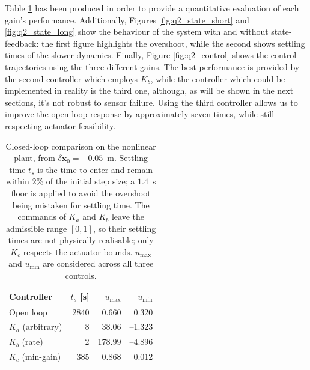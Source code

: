 \documentclass[10pt,a4paper]{scrartcl}
\begin{document}
Table \ref{tab:q2_cmp} has been produced in order to provide a quantitative evaluation of each gain's performance. 
Additionally, Figures \ref{fig:q2_state_short} and \ref{fig:q2_state_long} show the behaviour of the system with and without state-feedback: the first figure highlights the overshoot, while the second shows settling times of the slower dynamics. Finally, Figure \ref{fig:q2_control} shows the control trajectories using the three different gains. The best performance is provided by the second controller which employs $K_b$, while the controller which could be implemented in reality is the third one, although, as will be shown in the next sections, it's not robust to sensor failure. Using the third controller allows us to improve the open loop response by approximately seven times, while still respecting actuator feasibility. 

\begin{table}[htbp]
    \centering
    \small
    \renewcommand{\arraystretch}{1.1}
    \begin{tabular}{l r r r}
        \toprule
        Controller & $t_s$ [s] & $u_{\text{max}}$ & $u_{\text{min}}$ \\
        \midrule
        Open loop            & 2840 & 0.660 & \phantom{-}0.320 \\
        $K_a$ (arbitrary)    &    8 & 38.06 & --1.323         \\
        $K_b$ (rate)         &    2 & 178.99& --4.896          \\
        $K_c$ (min-gain)     &  385 & 0.868 & \phantom{-}0.012  \\
        \bottomrule
    \end{tabular}
    \caption{Closed-loop comparison on the nonlinear plant, from $\delta\bm{x}_0=-0.05$~m. Settling time $t_s$ is the time to enter and remain within $2\%$ of the initial step size; a $1.4$~s floor is applied to avoid the overshoot being mistaken for settling time. The commands of $K_a$ and $K_b$ leave the admissible range $[0,1]$, so their settling times are not physically realisable; only $K_c$ respects the actuator bounds. $u_{\text{max}}$ and $u_{\text{min}}$ are considered across all three controls. }
    \label{tab:q2_cmp}
\end{table}
\end{document}

